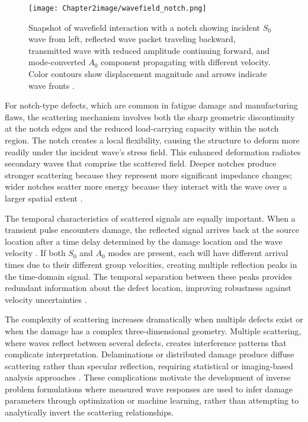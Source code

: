 \documentclass[12pt,a4paper]{report}
\begin{document}
\begin{figure}[h]
\centering
\texttt{[image: Chapter2image/wavefield\_notch.png]}
\caption{Snapshot of wavefield interaction with a notch showing incident $S_0$ wave from left, reflected wave packet traveling backward, transmitted wave with reduced amplitude continuing forward, and mode-converted $A_0$ component propagating with different velocity. Color contours show displacement magnitude and arrows indicate wave fronts \citep{article}.}
\label{fig:wave_scattering}
\end{figure}

For notch-type defects, which are common in fatigue damage and manufacturing flaws, the scattering mechanism involves both the sharp geometric discontinuity at the notch edges and the reduced load-carrying capacity within the notch region. The notch creates a local flexibility, causing the structure to deform more readily under the incident wave's stress field. This enhanced deformation radiates secondary waves that comprise the scattered field. Deeper notches produce stronger scattering because they represent more significant impedance changes; wider notches scatter more energy because they interact with the wave over a larger spatial extent \citep{cawley2018practical}.

The temporal characteristics of scattered signals are equally important. When a transient pulse encounters damage, the reflected signal arrives back at the source location after a time delay determined by the damage location and the wave velocity \citep{rose2014ultrasonic}. If both $S_0$ and $A_0$ modes are present, each will have different arrival times due to their different group velocities, creating multiple reflection peaks in the time-domain signal. The temporal separation between these peaks provides redundant information about the defect location, improving robustness against velocity uncertainties \citep{na2021review}.

The complexity of scattering increases dramatically when multiple defects exist or when the damage has a complex three-dimensional geometry. Multiple scattering, where waves reflect between several defects, creates interference patterns that complicate interpretation. Delaminations or distributed damage produce diffuse scattering rather than specular reflection, requiring statistical or imaging-based analysis approaches \citep{cawley2018practical}. These complications motivate the development of inverse problem formulations where measured wave responses are used to infer damage parameters through optimization or machine learning, rather than attempting to analytically invert the scattering relationships.
\end{document}
